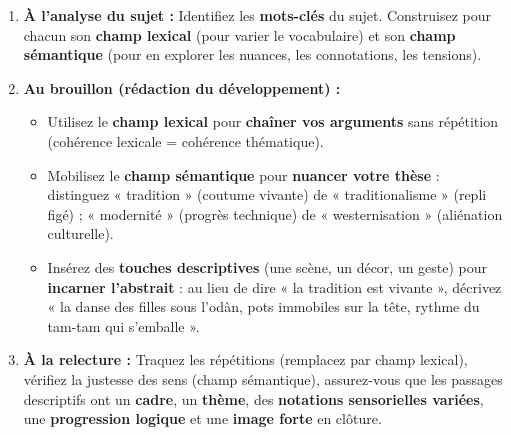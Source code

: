 \documentclass[11pt]{article}
\begin{document}
\begin{methode}
\begin{enumerate}
    \item \textbf{À l'analyse du sujet :} Identifiez les \textbf{mots-clés} du sujet. Construisez pour chacun son \textbf{champ lexical} (pour varier le vocabulaire) et son \textbf{champ sémantique} (pour en explorer les nuances, les connotations, les tensions).
    \item \textbf{Au brouillon (rédaction du développement) :}
        \begin{itemize}
            \item Utilisez le \textbf{champ lexical} pour \textbf{chaîner vos arguments} sans répétition (cohérence lexicale = cohérence thématique).
            \item Mobilisez le \textbf{champ sémantique} pour \textbf{nuancer votre thèse} : distinguez « tradition » (coutume vivante) de « traditionalisme » (repli figé) ; « modernité » (progrès technique) de « westernisation » (aliénation culturelle).
            \item Insérez des \textbf{touches descriptives} (une scène, un décor, un geste) pour \textbf{incarner l'abstrait} : au lieu de dire « la tradition est vivante », décrivez « la danse des filles sous l'odàn, pots immobiles sur la tête, rythme du tam-tam qui s'emballe ».
        \end{itemize}
    \item \textbf{À la relecture :} Traquez les répétitions (remplacez par champ lexical), vérifiez la justesse des sens (champ sémantique), assurez-vous que les passages descriptifs ont un \textbf{cadre}, un \textbf{thème}, des \textbf{notations sensorielles variées}, une \textbf{progression logique} et une \textbf{image forte} en clôture.
\end{enumerate}
\end{methode}
\end{document}
